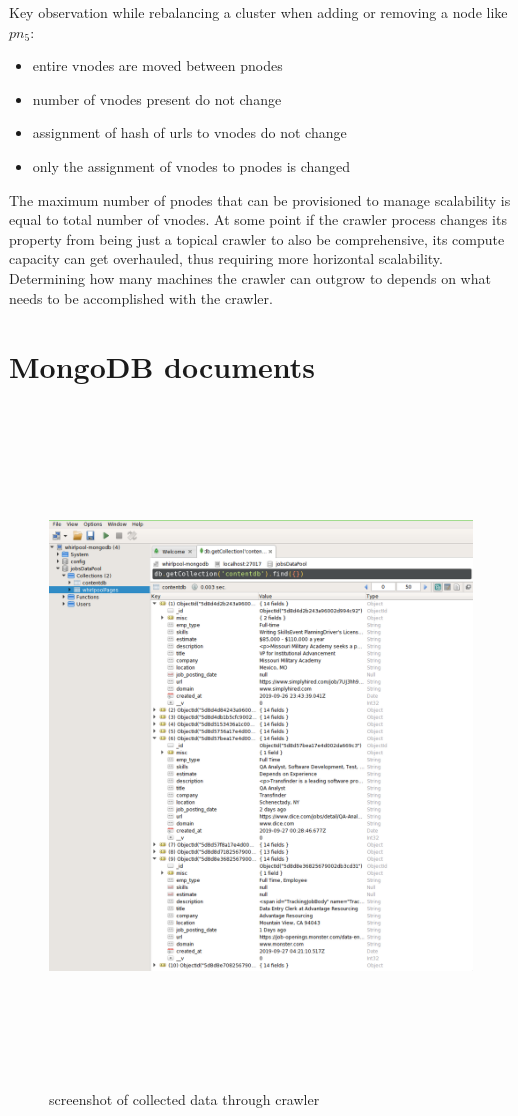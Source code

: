 \noindent
Key observation while rebalancing a cluster when adding or removing a node like $pn_5$:
\begin{itemize}
  \item entire vnodes are moved between pnodes
  \item number of vnodes present do not change 
  \item assignment of hash of urls to vnodes do not change
  \item only the assignment of vnodes to pnodes is changed
\end{itemize}

\noindent
The maximum number of pnodes that can be provisioned to manage scalability is equal to total number of
vnodes. At some point if the crawler process changes its property from being just a topical crawler to
also be comprehensive, its compute capacity can get overhauled, thus requiring more horizontal scalability.
Determining how many machines the crawler can outgrow to depends on what needs to be accomplished with the crawler.

\section{MongoDB documents}
\begin{figure}[h!]
  \centering
  \includegraphics[width=12cm,height=18cm,keepaspectratio]{../media/crawler/collecteddata.png}
  \caption{screenshot of collected data through crawler}
  \label{fig:mongo_data}
\end{figure}
\pagebreak

